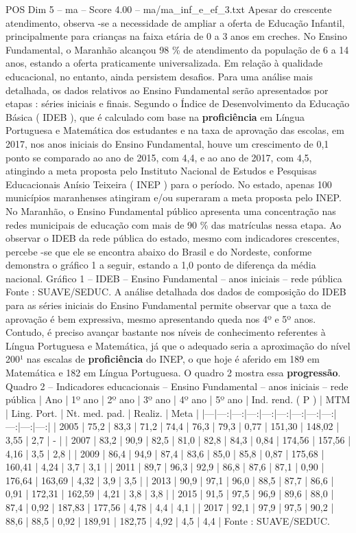 \begin{textsample}{POS Dim 5 – ma – Score 4.00 – ma/ma\_inf\_e\_ef\_3.txt}
Apesar do crescente atendimento, observa -se a necessidade de ampliar a oferta de Educação Infantil, principalmente para crianças na faixa etária de 0 a 3 anos em creches.
No Ensino Fundamental, o Maranhão alcançou 98 \% de atendimento da população de 6 a 14 anos, estando a oferta praticamente universalizada.
Em relação à qualidade educacional, no entanto, ainda persistem desafios.
Para uma análise mais detalhada, os dados relativos ao Ensino Fundamental serão apresentados por etapas : séries iniciais e finais.
Segundo o Índice de Desenvolvimento da Educação Básica ( IDEB ), que é calculado com base na \textbf{proficiência} em Língua Portuguesa e Matemática dos estudantes e na taxa de aprovação das escolas, em 2017, nos anos iniciais do Ensino Fundamental, houve um crescimento de 0,1 ponto se comparado ao ano de 2015, com 4,4, e ao ano de 2017, com 4,5, atingindo a meta proposta pelo Instituto Nacional de Estudos e Pesquisas Educacionais Anísio Teixeira ( INEP ) para o período.
No estado, apenas 100 municípios maranhenses atingiram e/ou superaram a meta proposta pelo INEP.
No Maranhão, o Ensino Fundamental público apresenta uma concentração nas redes municipais de educação com mais de 90 \% das matrículas nessa etapa.
Ao observar o IDEB da rede pública do estado, mesmo com indicadores crescentes, percebe -se que ele se encontra abaixo do Brasil e do Nordeste, conforme demonstra o gráfico 1 a seguir, estando a 1,0 ponto de diferença da média nacional.
Gráfico 1 – IDEB – Ensino Fundamental – anos iniciais – rede pública Fonte : SUAVE/SEDUC.
A análise detalhada dos dados de composição do IDEB para as séries iniciais do Ensino Fundamental permite observar que a taxa de aprovação é bem expressiva, mesmo apresentando queda nos 4º e 5º anos.
Contudo, é preciso avançar bastante nos níveis de conhecimento referentes à Língua Portuguesa e Matemática, já que o adequado seria a aproximação do nível 200¹ nas escalas de \textbf{proficiência} do INEP, o que hoje é aferido em 189 em Matemática e 182 em Língua Portuguesa.
O quadro 2 mostra essa \textbf{progressão}.
Quadro 2 – Indicadores educacionais – Ensino Fundamental – anos iniciais – rede pública | Ano | 1º ano | 2º ano | 3º ano | 4º ano | 5º ano | Ind. rend. ( P ) | MTM | Ling.
Port. | Nt. med. pad. | Realiz. | Meta | |---|---:|---:|---:|---:|---:|---:|---:|---:|---:|---:|---:| | 2005 | 75,2 | 83,3 | 71,2 | 74,4 | 76,3 | 79,3 | 0,77 | 151,30 | 148,02 | 3,55 | 2,7 | - | | 2007 | 83,2 | 90,9 | 82,5 | 81,0 | 82,8 | 84,3 | 0,84 | 174,56 | 157,56 | 4,16 | 3,5 | 2,8 | | 2009 | 86,4 | 94,9 | 87,4 | 83,6 | 85,0 | 85,8 | 0,87 | 175,68 | 160,41 | 4,24 | 3,7 | 3,1 | | 2011 | 89,7 | 96,3 | 92,9 | 86,8 | 87,6 | 87,1 | 0,90 | 176,64 | 163,69 | 4,32 | 3,9 | 3,5 | | 2013 | 90,9 | 97,1 | 96,0 | 88,5 | 87,7 | 86,6 | 0,91 | 172,31 | 162,59 | 4,21 | 3,8 | 3,8 | | 2015 | 91,5 | 97,5 | 96,9 | 89,6 | 88,0 | 87,4 | 0,92 | 187,83 | 177,56 | 4,78 | 4,4 | 4,1 | | 2017 | 92,1 | 97,9 | 97,5 | 90,2 | 88,6 | 88,5 | 0,92 | 189,91 | 182,75 | 4,92 | 4,5 | 4,4 | Fonte : SUAVE/SEDUC.

\end{textsample}
